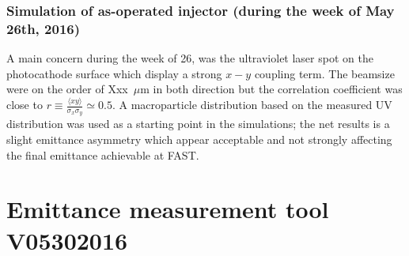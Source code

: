 \documentclass[notitlepage,twocolumn,nofootinbib,showpacs,preprintnumbers,superscriptaddress,amsmath,amssymb]{revtex4-1}
\newcommand{\mean}[1]{\mbox{$\langle{#1}\rangle$}}
\begin{document}
\subsubsection{Simulation of as-operated injector (during the week of May 26th, 2016)}
A main concern during the week of 26, was the ultraviolet laser spot on the photocathode surface which display a strong $x-y$ coupling term. The beamsize were on the order of Xxx~$\mu$m in both direction but the correlation coefficient was close to $r \equiv\frac{\mean{xy}}{\sigma_x\sigma_y}\simeq 0.5$. A macroparticle distribution based on the measured UV distribution was used as a starting point in the simulations; the net results is a slight emittance asymmetry which appear acceptable and not strongly affecting the final emittance achievable at FAST.  




%
%




\newpage
\appendix
\section{Emittance measurement tool V05302016}
\end{document}
